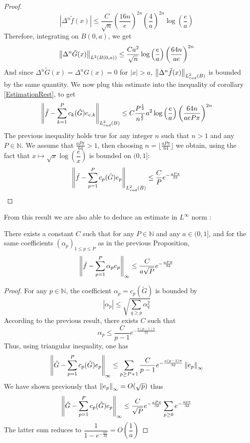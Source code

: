 \documentclass[11pt,a4paper]{article}
\begin{document}
\begin{The}
\begin{proof}
\[|\Delta^n \tilde{f} (x)|\leq \dfrac{C}{\sqrt{n}}\left( \frac{16n}{e}\right)^{2n}\left(\frac{4}{a}\right)^{2n}\log\left(\dfrac{e}{a}\right)  \]
Therefore, integrating on $B(0,a)$, we get
\[ \left\|\Delta^n \tilde{G}(x)\right\|_{L^2(B(0,a))} \leq \dfrac{C a^2}{\sqrt{n}}\log\left(\frac{e}{a}\right)\left( \frac{64n}{ae}\right)^{2n}\]
And since $\Delta^n \tilde{G}(x) = \Delta^n G(x) = 0$ for $|x|>a$, $\left\|\Delta^n \tilde{f}(x)\right\|_{L^2_{rad}(B)}$ is bounded by the same quantity. 
We now plug this estimate into the inequality of corollary \ref{EstimationRest}, to get
\[ \left\|\tilde{f} - \sum_{k=1}^{P}c_k(\tilde{G})e_{c,k}\right\|_{L^2_{rad}(B)} \leq C \dfrac{P^\frac{1}{2}}{n^{\frac{3}{2}}} a^2 \log\left(\dfrac{e}{a}\right)\left( \frac{64 n}{ae P \pi}\right)^{2n}\] 
The previous inequality holds true for any integer $n$ such that $n>1$ and any $P \in \mathbb{N}$. We assume that $\frac{aP\pi}{64} >1$, then choosing $n = \lfloor \frac{aP\pi}{64}\rfloor $ we obtain, using the fact that $x\mapsto \sqrt{x} \log\left(\dfrac{e}{x}\right)$ is bounded on $(0,1]$:
\[ \left\|\tilde{f} - \sum_{p=1}^{P}c_p(\tilde{G})e_p\right\|_{L^2_{rad}(B)} \leq \frac{C}{P} e^{-\frac{aP\pi}{32}}\]
\end{proof}
\label{TheLaplace}
\end{The}

From this result we are also able to deduce an estimate in $L^\infty$ norm : 
\begin{Cor} There exists a constant $C$ such that for any $P\in \mathbb{N}$ and any $a\in(0,1]$, and for the same coefficients $(\alpha_p)_{1\leq p\leq P}$ as in the previous Proposition, 
\[ \left\|\tilde{f} - \sum_{p=1}^{P}\alpha_p e_p\right\|_{\infty} \leq \frac{C}{a\sqrt{P}} e^{-\frac{aP\pi}{32}}\]
\begin{proof} For any $p \in \mathbb{N}$, the coefficient $\alpha_p = c_p(\tilde{G})$ is bounded by 
\[ |\alpha_p| \leq \sqrt{\sum_{q \geq p} \alpha_q^2} \]  
According to the previous result, there exists $C$ such that 
\[ \alpha_p \leq \dfrac{C}{p-1}e^{-\frac{a(p-1)\pi}{32}} \]
Thus, using triangular inequality, one has 
\[ \left\|\tilde{G} - \sum_{p=1}^P c_p(\tilde{G})e_p\right\|_{\infty} \leq \sum_{p\geq P+1} \dfrac{C}{p-1}e^{-\frac{a(p-1)\pi}{32}} \left\|e_p\right\|_{\infty}\]
We have shown previously that $\left\|e_p\right\|_{\infty} = O(\sqrt{p})$ thus 
\[\left\|\tilde{G} - \sum_{p=1}^P c_p(\tilde{G})e_p\right\|_{\infty} \leq  \dfrac{C}{\sqrt{P}}e^{-\frac{aP\pi}{32}} \sum_{p\geq 0}e^{-\frac{ap\pi}{32}} \]
The latter sum reduces to $\dfrac{1}{1-e^{-\frac{a\pi}{32}}} = O\left(\dfrac{1}{a}\right)$ 
\end{proof}
\end{Cor}
\end{document}
